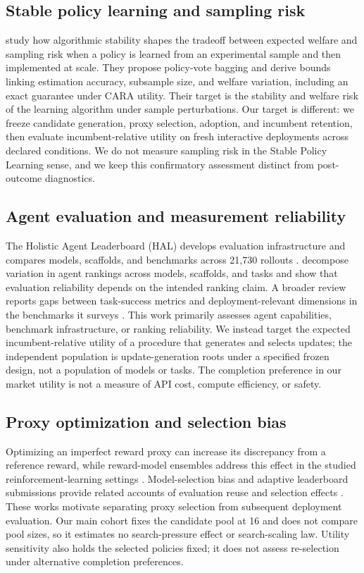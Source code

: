 \documentclass[10pt,letterpaper]{article}
\begin{document}
\subsection{Stable policy learning and sampling risk}
\citet{stable2026} study how algorithmic stability shapes the tradeoff between expected welfare and sampling risk when a policy is learned from an experimental sample and then implemented at scale. They propose policy-vote bagging and derive bounds linking estimation accuracy, subsample size, and welfare variation, including an exact guarantee under CARA utility. Their target is the stability and welfare risk of the learning algorithm under sample perturbations. Our target is different: we freeze candidate generation, proxy selection, adoption, and incumbent retention, then evaluate incumbent-relative utility on fresh interactive deployments across declared conditions. We do not measure sampling risk in the Stable Policy Learning sense, and we keep this confirmatory assessment distinct from post-outcome diagnostics.

\subsection{Agent evaluation and measurement reliability}
The Holistic Agent Leaderboard (HAL) develops evaluation infrastructure and compares models, scaffolds, and benchmarks across 21,730 rollouts \citep{kapoor2026}. \citet{hardy2026} decompose variation in agent rankings across models, scaffolds, and tasks and show that evaluation reliability depends on the intended ranking claim. A broader review reports gaps between task-success metrics and deployment-relevant dimensions in the benchmarks it surveys \citep{kehkashan2026}. This work primarily assesses agent capabilities, benchmark infrastructure, or ranking reliability. We instead target the expected incumbent-relative utility of a procedure that generates and selects updates; the independent population is update-generation roots under a specified frozen design, not a population of models or tasks. The completion preference in our market utility is not a measure of API cost, compute efficiency, or safety.

\subsection{Proxy optimization and selection bias}
Optimizing an imperfect reward proxy can increase its discrepancy from a reference reward, while reward-model ensembles address this effect in the studied reinforcement-learning settings \citep{gao2022,coste2024}. Model-selection bias and adaptive leaderboard submissions provide related accounts of evaluation reuse and selection effects \citep{cawley2010,blum2015}. These works motivate separating proxy selection from subsequent deployment evaluation. Our main cohort fixes the candidate pool at 16 and does not compare pool sizes, so it estimates no search-pressure effect or search-scaling law. Utility sensitivity also holds the selected policies fixed; it does not assess re-selection under alternative completion preferences.
\end{document}
